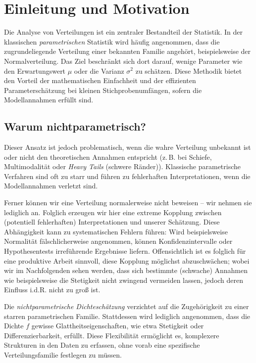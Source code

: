 \documentclass[a4paper, 11pt]{scrartcl}
\newif\ifshowtext
\begin{document}
\maketitle

\ifshowtext
\tableofcontents
\newpage
\fi

\section{Einleitung und Motivation}

Die Analyse von Verteilungen ist ein zentraler Bestandteil der Statistik. In der klassischen \textit{parametrischen} Statistik wird häufig angenommen, dass die zugrundeliegende Verteilung einer bekannten Familie angehört, beispielsweise der Normalverteilung. Das Ziel beschränkt sich dort darauf, wenige Parameter wie den Erwartungswert $\mu$ oder die Varianz $\sigma^2$ zu schätzen. Diese Methodik bietet den Vorteil der mathematischen Einfachheit und der effizienten Parameterschätzung bei kleinen Stichprobenumfängen, sofern die Modellannahmen erfüllt sind.

\subsection*{Warum nichtparametrisch?}

Dieser Ansatz ist jedoch problematisch, wenn die wahre Verteilung unbekannt ist oder nicht den theoretischen Annahmen entspricht (z.\,B. bei Schiefe, Multimodalität oder \textit{Heavy Tails} (schwere Ränder)). Klassische parametrische Verfahren sind oft zu starr und führen zu fehlerhaften Interpretationen, wenn die Modellannahmen verletzt sind.

Ferner können wir eine Verteilung normalerweise nicht beweisen – wir nehmen sie lediglich an. Folglich erzeugen wir hier eine extreme Kopplung zwischen (potentiell fehlerhaften) Interpretationen und unserer Schätzung. Diese Abhängigkeit kann zu systematischen Fehlern führen: Wird beispielsweise Normalität fälschlicherweise angenommen, können Konfidenzintervalle oder Hypothesentests irreführende Ergebnisse liefern. Offensichtlich ist es folglich für eine produktive Arbeit sinnvoll, diese Kopplung möglichst abzuschwächen; wobei wir im Nachfolgenden sehen werden, dass sich bestimmte (schwache) Annahmen wie beispielsweise die Stetigkeit nicht zwingend vermeiden lassen, jedoch deren Einfluss i.d.R. nicht zu groß ist.

Die \textit{nichtparametrische Dichteschätzung} verzichtet auf die Zugehörigkeit zu einer starren parametrischen Familie. Stattdessen wird lediglich angenommen, dass die Dichte $f$ gewisse Glattheitseigenschaften, wie etwa Stetigkeit oder Differenzierbarkeit, erfüllt. Diese Flexibilität ermöglicht es, komplexere Strukturen in den Daten zu erfassen, ohne vorab eine spezifische Verteilungsfamilie festlegen zu müssen.
\end{document}
